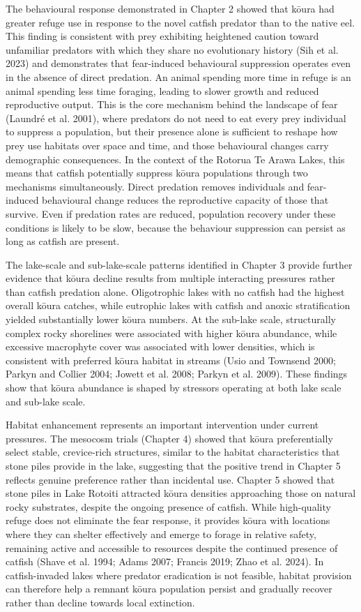 \documentclass[
  12pt,
  a4paper,
  oneside]{scrbook}
\begin{document}
The behavioural response demonstrated in Chapter 2 showed that kōura had
greater refuge use in response to the novel catfish predator than to the
native eel. This finding is consistent with prey exhibiting heightened
caution toward unfamiliar predators with which they share no
evolutionary history (Sih et al. 2023) and demonstrates that
fear-induced behavioural suppression operates even in the absence of
direct predation. An animal spending more time in refuge is an animal
spending less time foraging, leading to slower growth and reduced
reproductive output. This is the core mechanism behind the landscape of
fear (Laundré et al. 2001), where predators do not need to eat every
prey individual to suppress a population, but their presence alone is
sufficient to reshape how prey use habitats over space and time, and
those behavioural changes carry demographic consequences. In the context
of the Rotorua Te Arawa Lakes, this means that catfish potentially
suppress kōura populations through two mechanisms simultaneously. Direct
predation removes individuals and fear-induced behavioural change
reduces the reproductive capacity of those that survive. Even if
predation rates are reduced, population recovery under these conditions
is likely to be slow, because the behaviour suppression can persist as
long as catfish are present.

The lake-scale and sub-lake-scale patterns identified in Chapter 3
provide further evidence that kōura decline results from multiple
interacting pressures rather than catfish predation alone. Oligotrophic
lakes with no catfish had the highest overall kōura catches, while
eutrophic lakes with catfish and anoxic stratification yielded
substantially lower kōura numbers. At the sub-lake scale, structurally
complex rocky shorelines were associated with higher kōura abundance,
while excessive macrophyte cover was associated with lower densities,
which is consistent with preferred kōura habitat in streams (Usio and
Townsend 2000; Parkyn and Collier 2004; Jowett et al. 2008; Parkyn et
al. 2009). These findings show that kōura abundance is shaped by
stressors operating at both lake scale and sub-lake scale.

Habitat enhancement represents an important intervention under current
pressures. The mesocosm trials (Chapter 4) showed that kōura
preferentially select stable, crevice-rich structures, similar to the
habitat characteristics that stone piles provide in the lake, suggesting
that the positive trend in Chapter 5 reflects genuine preference rather
than incidental use. Chapter 5 showed that stone piles in Lake Rotoiti
attracted kōura densities approaching those on natural rocky substrates,
despite the ongoing presence of catfish. While high-quality refuge does
not eliminate the fear response, it provides kōura with locations where
they can shelter effectively and emerge to forage in relative safety,
remaining active and accessible to resources despite the continued
presence of catfish (Shave et al. 1994; Adams 2007; Francis 2019; Zhao
et al. 2024). In catfish-invaded lakes where predator eradication is not
feasible, habitat provision can therefore help a remnant kōura
population persist and gradually recover rather than decline towards
local extinction.
\end{document}
